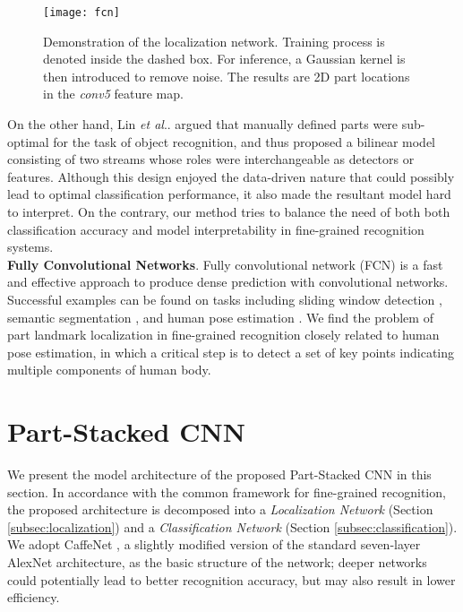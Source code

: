 \documentclass[10pt,twocolumn,letterpaper]{article}
\makeatletter
\DeclareRobustCommand\onedot{\futurelet\@let@token\@onedot}
\def\@onedot{\ifx\@let@token.\else.\null\fi\xspace}
\def\etal{\emph{et al}\onedot}
\makeatother
\begin{document}
\begin{figure*}[t]
\begin{center}
\texttt{[image: fcn]}
\end{center}
   \caption{Demonstration of the localization network. Training process is denoted inside the dashed box. For inference, a Gaussian kernel is then introduced to remove noise. The results are  2D part locations in the  \textit{conv5} feature map.}
\label{fig:fcn}
\end{figure*}



On the other hand, Lin \etal \cite{lin2015bilinear} argued that manually defined parts were sub-optimal for the task of object recognition, and thus proposed a bilinear model consisting of two streams whose roles were interchangeable as detectors or features. Although this design enjoyed the data-driven nature that could possibly lead to optimal classification performance, it also made the resultant model hard to interpret. On the contrary, our method tries to balance the need of both both classification accuracy and model interpretability in fine-grained recognition systems. \\














\noindent\textbf{Fully Convolutional Networks}.
Fully convolutional network (FCN) is a fast and effective approach to produce dense prediction with convolutional networks. Successful examples can be found on tasks including sliding window detection \cite{sermanet2013overfeat}, semantic segmentation \cite{long2015fully}, and human pose estimation \cite{tompson2014joint}. We find the problem of part landmark localization in fine-grained recognition closely related to human pose estimation, in which a critical step is to detect a set of key points indicating multiple components of human body.








\section{Part-Stacked CNN} \label{sec:pscnn}




We present the model architecture of the proposed Part-Stacked CNN in this section. In accordance with the common framework for fine-grained recognition, the proposed architecture is decomposed into a \emph{Localization Network} (Section \ref{subsec:localization}) and a \emph{Classification Network} (Section \ref{subsec:classification}). 
We adopt CaffeNet \cite{jia2014caffe}, a slightly modified version of the standard seven-layer AlexNet \cite{krizhevsky2012imagenet} architecture, as the basic structure of the network; deeper networks could potentially lead to better recognition accuracy, but may also result in lower efficiency. 
\end{document}
